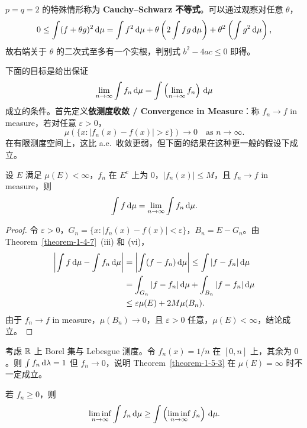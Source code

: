 \begin{remark}
    $p = q = 2$ 的特殊情形称为 {\normalfont\bfseries Cauchy--Schwarz 不等式}。可以通过观察对任意 $\theta$，
    \[
        0 \le \int (f + \theta g)^2 \,\mathrm{d}\mu = \int f^2 \,\mathrm{d}\mu + \theta \left(2\int fg \,\mathrm{d}\mu\right) + \theta^2 \left(\int g^2 \,\mathrm{d}\mu\right),
    \]
    故右端关于 $\theta$ 的二次式至多有一个实根，判别式 $b^2 - 4ac \le 0$ 即得。
\end{remark}

下面的目标是给出保证
\[
    \lim_{n \to \infty} \int f_n \,\mathrm{d}\mu = \int \left(\lim_{n \to \infty} f_n\right) \,\mathrm{d}\mu
\]
成立的条件。首先定义{\normalfont\bfseries 依测度收敛 / Convergence in Measure}：称 $f_n \to f$ in measure，若对任意 $\varepsilon > 0$，
\[
    \mu(\{x : |f_n(x) - f(x)| > \varepsilon\}) \to 0 \quad \text{as } n \to \infty.
\]
在有限测度空间上，这比 a.e.\ 收敛更弱，但下面的结果在这种更一般的假设下成立。

\begin{theorem}\label{theorem-1-5-3}
    设 $E$ 满足 $\mu(E) < \infty$，$f_n$ 在 $E^c$ 上为 $0$，$|f_n(x)| \le M$，且 $f_n \to f$ in measure，则
    \[
        \int f \,\mathrm{d}\mu = \lim_{n \to \infty} \int f_n \,\mathrm{d}\mu.
    \]
\end{theorem}

\begin{proof}
    令 $\varepsilon > 0$，$G_n = \{x : |f_n(x) - f(x)| < \varepsilon\}$，$B_n = E - G_n$。由 Theorem~\ref{theorem-1-4-7}~(iii) 和 (vi)，
    \begin{align*}
        \left|\int f \,\mathrm{d}\mu - \int f_n \,\mathrm{d}\mu\right|
         & = \left|\int (f - f_n) \,\mathrm{d}\mu\right| \le \int |f - f_n| \,\mathrm{d}\mu \\
         & = \int_{G_n} |f - f_n| \,\mathrm{d}\mu + \int_{B_n} |f - f_n| \,\mathrm{d}\mu    \\
         & \le \varepsilon \mu(E) + 2M \mu(B_n).
    \end{align*}
    由于 $f_n \to f$ in measure，$\mu(B_n) \to 0$，且 $\varepsilon > 0$ 任意，$\mu(E) < \infty$，结论成立。
\end{proof}

\begin{example}
    考虑 $\mathbb{R}$ 上 Borel 集与 Lebesgue 测度。令 $f_n(x) = 1/n$ 在 $[0,n]$ 上，其余为 $0$。则 $\int f_n \,\mathrm{d}\lambda = 1$ 但 $f_n \to 0$，说明 Theorem~\ref{theorem-1-5-3} 在 $\mu(E) = \infty$ 时不一定成立。
\end{example}

\begin{theorem}\label{theorem-1-5-5}
    若 $f_n \ge 0$，则
    \[
        \liminf_{n \to \infty} \int f_n \,\mathrm{d}\mu \ge \int \left(\liminf_{n \to \infty} f_n\right) \,\mathrm{d}\mu.
    \]
\end{theorem}

